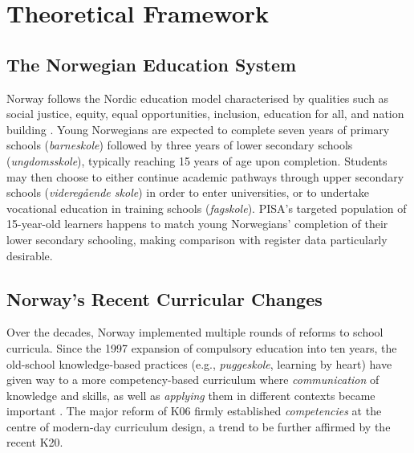 \documentclass[
    a4paper,                %
    11pt,                   %
    stu,                    %
    donotrepeattitle,       %
    floatsintext,           %
    biblatex,               %
    colorlinks=true,        %
    linkcolor=red,          %
    anchorcolor=black,      %
    citecolor=blue,         %
    urlcolor=blue,          %
    bookmarks=true,         %
    bookmarksopen=false,    %
    bookmarksnumbered=true, %
    dvipsnames              %
]{apa7}
\begin{document}
\section{Theoretical Framework}


\subsection{The Norwegian Education System}

Norway follows the Nordic education model characterised by qualities such as social justice, equity, equal opportunities, inclusion, education for all, and nation building \parencite{imsen:2017}. Young Norwegians are expected to complete seven years of primary schools (\textit{barneskole}) followed by three years of lower secondary schools (\textit{ungdomsskole}), typically reaching 15 years of age upon completion. Students may then choose to either continue academic pathways through upper secondary schools (\textit{videreg{\aa}ende skole}) in order to enter universities, or to undertake vocational education in training schools (\textit{fagskole}). PISA's targeted population of 15-year-old learners happens to match young Norwegians' completion of their lower secondary schooling, making comparison with register data particularly desirable.

\subsection{Norway's Recent Curricular Changes}

Over the decades, Norway implemented multiple rounds of reforms to school curricula. Since the 1997 expansion of compulsory education into ten years, the old-school knowledge-based practices (e.g., \textit{puggeskole}, learning by heart) have given way to a more competency-based curriculum where \emph{communication} of knowledge and skills, as well as \emph{applying} them in different contexts became important \parencite{imsen:2017}. The major reform of K06 firmly established \emph{competencies} at the centre of modern-day curriculum design, a trend to be further affirmed by the recent K20.
\end{document}
